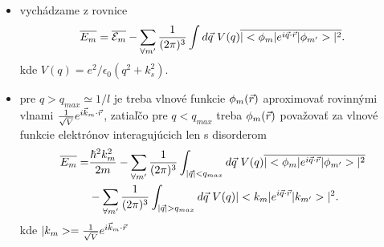 \documentclass[
	11pt, %
]{beamer}
\begin{document}
\begin{frame}
\begin{itemize}
\item vychádzame z rovnice
\begin{equation}
\label{eq:erg_meandis nex}
 \overline{E_m}=\overline{\mathcal{E}_m}-\sum_{\forall m'} \frac{1}{(2\pi)^{3}} \int d\vec{q}\ V(q) \overline{|<\phi_m|e^{i\vec{q}\cdot\vec{r}}|\phi_{m'}>|^2} \text{.}
\end{equation}
kde $V(q) = e^2/\epsilon_0(q^2+k_s^2)$.
\item pre $q > q_{max} \simeq 1/l$ je treba vlnové funkcie $\phi_m(\vec{r})$ aproximovať rovinnými vlnami $\frac{1}{\sqrt V}e^{i\vec{k}_m\cdot\vec{r}}$, zatiaľčo pre $q < q_{max}$ treba
$\phi_m(\vec{r})$ považovať za vlnové funkcie elektrónov interagujúcich len s disorderom
\begin{equation}\label{eq:erg_meandis nex nex}
\begin{split}
 \overline{E_m}= &\frac{\hbar^2 k_m^2}{2m} - \sum_{\forall m'} \frac{1}{(2\pi)^{3}} \int_{|\vec{q}| < q_{max}} d\vec{q}\ V(q) \overline{|<\phi_m|e^{i\vec{q}\cdot\vec{r}}|\phi_{m'}>|^2}  \\
    &  - \sum_{\forall m'} \frac{1}{(2\pi)^{3}} \int_{|\vec{q}| > q_{max}} d\vec{q}\ V(q) |<k_m|e^{i\vec{q}\cdot\vec{r}}|k_{m'}>|^2 \text{.}
\end{split}
\end{equation}
kde $|k_{m}>= \frac{1}{\sqrt V}e^{i\vec{k}_m\cdot\vec{r}}$
\end{itemize}
\end{frame}
\end{document}
